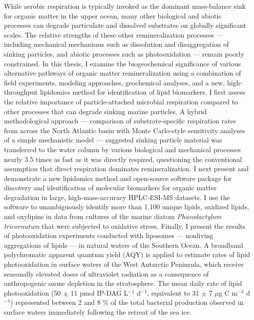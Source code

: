 % 
% 
%
While aerobic respiration is typically invoked as the dominant mass-balance sink for organic matter in the upper ocean, many other biological and abiotic processes can degrade particulate and dissolved substrates on globally significant scales. The relative strengths of these other remineralization processes --- including mechanical mechanisms such as dissolution and disaggregation of sinking particles, and abiotic processes such as photooxidation --- remain poorly constrained. In this thesis, I examine the biogeochemical significance of various alternative pathways of organic matter remineralization using a combination of field experiments, modeling approaches, geochemical analyses, and a new, high-throughput lipidomics method for identification of lipid biomarkers. I first assess the relative importance of particle-attached microbial respiration compared to other processes that can degrade sinking marine particles. A hybrid methodological approach --- comparison of substrate-specific respiration rates from across the North Atlantic basin with Monte Carlo-style sensitivity analyses of a simple mechanistic model --- suggested sinking particle material was transferred to the water column by various biological and mechanical processes nearly 3.5 times as fast as it was directly respired, questioning the conventional assumption that direct respiration dominates remineralization. I next present and demonstrate a new lipidomics method and open-source software package for discovery and identification of molecular biomarkers for organic matter degradation in large, high-mass-accuracy HPLC-ESI-MS datasets. I use the software to unambiguously identify more than 1,100 unique lipids, oxidized lipids, and oxylipins in data from cultures of the marine diatom \emph{Phaeodactylum tricornutum} that were subjected to oxidative stress. Finally, I present the results of photooxidation experiments conducted with liposomes --- nonliving aggregations of lipids --- in natural waters of the Southern Ocean. A broadband polychromatic apparent quantum yield (AQY) is applied to estimate rates of lipid photooxidation in surface waters of the West Antarctic Peninsula, which receive seasonally elevated doses of ultraviolet radiation as a consequence of anthropogenic ozone depletion in the stratosphere. The mean daily rate of lipid photooxidation (50 $\pm$ 11 pmol IP-DAG L$^{-1}$ d$^{-1}$, equivalent to 31 $\pm$ 7 $\mu$g C m$^{-3}$ d$^{-1}$) represented between 2 and 8 \% of the total bacterial production observed in surface waters immediately following the retreat of the sea ice.

